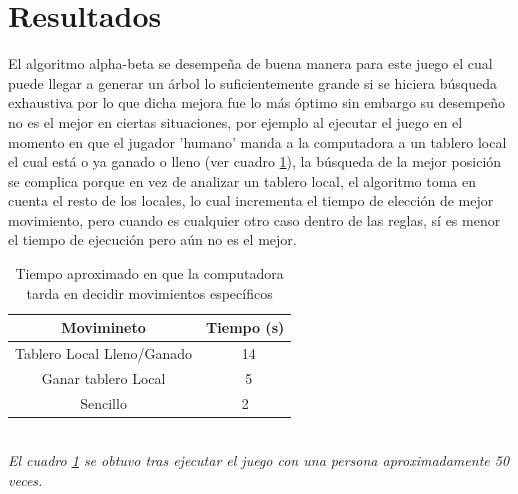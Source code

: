 \documentclass[runningheads]{llncs}
\begin{document}
\section{Resultados}
El algoritmo alpha-beta se desempeña de buena manera para este juego el cual puede llegar a generar un árbol lo suficientemente grande si se hiciera búsqueda exhaustiva por lo que dicha mejora fue lo más óptimo sin embargo su desempeño no es el mejor en ciertas situaciones, por ejemplo al ejecutar el juego en el momento en que el jugador 'humano' manda a la computadora a un tablero local el cual está o ya ganado o lleno (ver cuadro \ref{tab:1}), la búsqueda de la mejor posición se complica porque en vez de analizar un tablero local, el algoritmo toma en cuenta el resto de los locales, lo cual incrementa el tiempo de elección de mejor movimiento, pero cuando es cualquier otro caso dentro de las reglas, sí es menor el tiempo de ejecución pero aún no es el mejor.
\begin{table}
\begin{center}
\begin{tabular}{| c | c |}
Movimineto & Tiempo (s) \\ \hline
Tablero Local Lleno/Ganado & ~14  \\
Ganar tablero Local & ~5\\
Sencillo &  2 \\ \hline
\end{tabular}
\caption{Tiempo aproximado en que la computadora tarda en decidir movimientos específicos}
\label{tab:1}
\end{center}
\end{table}
\\
\textit{El cuadro \ref{tab:1} se obtuvo tras ejecutar el juego con una persona aproximadamente 50 veces.}
\end{document}
